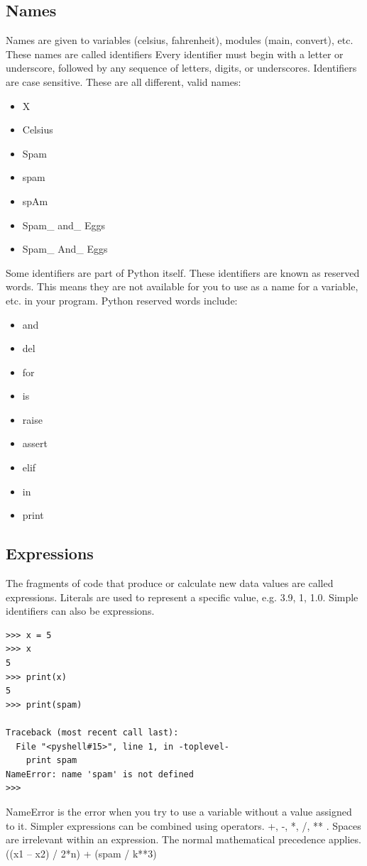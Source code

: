 \documentclass[12pt,a4paper,final,twoside,titlepage]{book}
\begin{document}
\subsection{Names}
Names are given to variables (celsius, fahrenheit), modules (main, convert), etc. These names are called identifiers Every identifier must begin with a letter or underscore, followed by any sequence of letters, digits, or underscores. Identifiers are case sensitive. These are all different, valid names:
\begin{itemize}
\item X
\item Celsius
\item Spam
\item spam
\item spAm
\item Spam\_ and\_ Eggs
\item Spam\_ And\_ Eggs
\end{itemize}
Some identifiers are part of Python itself. These identifiers are known as reserved words. This means they are not available for you to use as a name for a variable, etc. in your program. Python reserved words include:
\begin{itemize}
\item and 
\item del
\item for
\item is
\item raise
\item assert
\item elif
\item in
\item print
\end{itemize}
\subsection{Expressions}
The fragments of code that produce or calculate new data values are called expressions. Literals are used to represent a specific value, e.g. 3.9, 1, 1.0. Simple identifiers can also be expressions.
\lstset{language=Python, tabsize=4}
\begin{lstlisting}
>>> x = 5
>>> x
5
>>> print(x)
5
>>> print(spam)

Traceback (most recent call last):
  File "<pyshell#15>", line 1, in -toplevel-
    print spam
NameError: name 'spam' is not defined
>>> 
\end{lstlisting}
NameError is the error when you try to use a variable without a value assigned to it. Simpler expressions can be combined using operators. +, -, *, /, ** . Spaces are irrelevant within an expression. The normal mathematical precedence applies.
((x1 – x2) / 2*n) + (spam / k**3)
\end{document}

